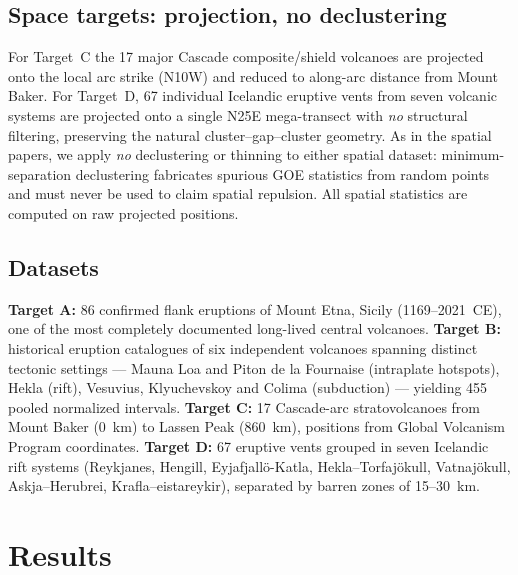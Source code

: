 \documentclass[11pt]{article}
\begin{document}
\subsection{Space targets: projection, no declustering}
For Target~C the 17 major Cascade composite/shield volcanoes are projected onto
the local arc strike (N10\textdegree W) and reduced to along-arc distance from
Mount Baker. For Target~D, 67 individual Icelandic eruptive vents from seven
volcanic systems are projected onto a single N25\textdegree E mega-transect with
\emph{no} structural filtering, preserving the natural cluster--gap--cluster
geometry. As in the spatial papers, we apply \emph{no} declustering or thinning
to either spatial dataset: minimum-separation declustering fabricates spurious
GOE statistics from random points and must never be used to claim spatial
repulsion. All spatial statistics are computed on raw projected positions.

\subsection{Datasets}
\textbf{Target A:} 86 confirmed flank eruptions of Mount Etna, Sicily
(1169--2021~CE), one of the most completely documented long-lived central
volcanoes. \textbf{Target B:} historical eruption catalogues of six independent
volcanoes spanning distinct tectonic settings --- Mauna Loa and Piton de la
Fournaise (intraplate hotspots), Hekla (rift), Vesuvius, Klyuchevskoy and
Colima (subduction) --- yielding 455 pooled normalized intervals.
\textbf{Target C:} 17 Cascade-arc stratovolcanoes from Mount Baker (0~km) to
Lassen Peak (860~km), positions from Global Volcanism Program coordinates.
\textbf{Target D:} 67 eruptive vents grouped in seven Icelandic rift systems
(Reykjanes, Hengill, Eyjafjall\"o-Katla, Hekla--Torfaj\"okull, Vatnaj\"okull,
Askja--Her{\dh}ubrei{\dh}, Krafla--{\TH}eistareykir), separated by barren zones
of 15--30~km.

\section{Results}
\end{document}
